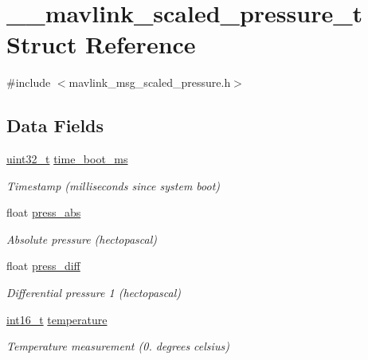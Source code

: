 \hypertarget{struct____mavlink__scaled__pressure__t}{\section{\-\_\-\-\_\-mavlink\-\_\-scaled\-\_\-pressure\-\_\-t Struct Reference}
\label{struct____mavlink__scaled__pressure__t}
}


{\ttfamily \#include $<$mavlink\-\_\-msg\-\_\-scaled\-\_\-pressure.\-h$>$}

\subsection*{Data Fields}
\begin{DoxyCompactItemize}
\item 
\hyperlink{stdint_8h_a435d1572bf3f880d55459d9805097f62}{uint32\-\_\-t} \hyperlink{struct____mavlink__scaled__pressure__t_a86306943b70fe3c60db24d56c90daf70}{time\-\_\-boot\-\_\-ms}
\begin{DoxyCompactList}\small\item\em Timestamp (milliseconds since system boot) \end{DoxyCompactList}\item 
float \hyperlink{struct____mavlink__scaled__pressure__t_a934eb017154df68b78c6448a9c568d56}{press\-\_\-abs}
\begin{DoxyCompactList}\small\item\em Absolute pressure (hectopascal) \end{DoxyCompactList}\item 
float \hyperlink{struct____mavlink__scaled__pressure__t_a44d34c48be09332608a4d9dc36a809cb}{press\-\_\-diff}
\begin{DoxyCompactList}\small\item\em Differential pressure 1 (hectopascal) \end{DoxyCompactList}\item 
\hyperlink{stdint_8h_aa343fa3b3d06292b959ffdd4c4703b06}{int16\-\_\-t} \hyperlink{struct____mavlink__scaled__pressure__t_ac9c9eba0a5fce8ca9324859b1b9ab413}{temperature}
\begin{DoxyCompactList}\small\item\em Temperature measurement (0. degrees celsius) \end{DoxyCompactList}\end{DoxyCompactItemize}


